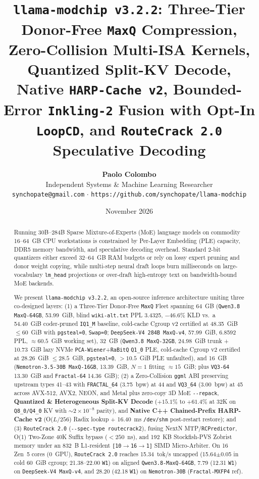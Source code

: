 \documentclass[10pt,twocolumn]{article}
\title{\textbf{\Large \texttt{llama-modchip v3.2.2}: Three-Tier Donor-Free \texttt{MaxQ} Compression, Zero-Collision Multi-ISA Kernels, Quantized Split-KV Decode, Native \texttt{HARP-Cache v2}, Bounded-Error \texttt{Inkling-2} Fusion with Opt-In \texttt{LoopCD}, and \texttt{RouteCrack 2.0} Speculative Decoding}}
\author{
  \textbf{Paolo Colombo} \\
  Independent Systems \& Machine Learning Researcher \\
  \texttt{synchopate@gmail.com} \quad $\cdot$ \quad \texttt{https://github.com/synchopate/llama-modchip}
}
\date{November 2026}
\begin{document}
\maketitle

\begin{abstract}
Running 30B--284B Sparse Mixture-of-Experts (MoE) language models on commodity 16--64~GB CPU workstations is constrained by Per-Layer Embedding (PLE) capacity, DDR5 memory bandwidth, and speculative decoding overhead. Standard 2-bit quantizers either exceed 32--64~GB RAM budgets or rely on lossy expert pruning and donor weight copying, while multi-step neural draft loops burn milliseconds on large-vocabulary \texttt{lm\_head} projections or over-draft high-entropy text on bandwidth-bound MoE backends.

We present \texttt{llama-modchip v3.2.2}, an open-source inference architecture uniting three co-designed layers: (1) a Three-Tier Donor-Free \texttt{MaxQ} Fleet spanning 64~GB (\texttt{Qwen3.8 MaxQ-64GB}, 53.99~GiB, blind \texttt{wiki-alt.txt} PPL 3.4325, $-46.6\%$ KLD vs.\ a 54.40~GiB coder-pruned \texttt{IQ1\_M} baseline, cold-cache Cgroup v2 certified at 48.35~GiB $\le 60$~GiB with \texttt{pgsteal=0}, \texttt{Swap=0}; \texttt{DeepSeek-V4 284B MaxQ-v4}, 57.99~GiB, 6.8592 PPL, $\approx 60.5$~GiB working set), 32~GB (\texttt{Qwen3.8 MaxQ-32GB}, 24.98~GiB trunk + 10.73~GiB lazy NVMe \texttt{PCA-Wiener}+\texttt{RaBitQ} \mbox{\texttt{Q1\_0}} PLE, cold-cache Cgroup v2 certified at 28.26~GiB $\le 28.5$~GiB, \texttt{pgsteal=0}, $>10.5$~GiB PLE unfaulted), and 16~GB (\texttt{Nemotron-3.5-30B MaxQ-16GB}, 13.39~GiB, $N=1$ fitting ${\approx}15$~GiB; plus \texttt{VQ3-64} 13.30~GiB and \texttt{Fractal-64} 14.36~GiB); (2) a Zero-Collision \texttt{ggml} ABI preserving upstream types 41--43 with \texttt{FRACTAL\_64} (3.75~bpw) at 44 and \texttt{VQ3\_64} (3.00~bpw) at 45 across AVX-512, AVX2, NEON, and Metal plus zero-copy 3D MoE \texttt{{-}{-}repack}, \textbf{Quantized \& Heterogeneous Split-KV Decode} ($+15.1\%$ to $+61.4\%$ at 32K on \texttt{Q8\_0/Q4\_0} KV with ${\sim}2\times 10^{-8}$ parity), and \textbf{Native C++ Chained-Prefix HARP-Cache v2} (O($L/256$) Radix lookup + 16.40~ms \texttt{/dev/shm} post-restart restore); and (3) \texttt{RouteCrack 2.0} (\texttt{{-}{-}spec-type routecrack2}), fusing NextN MTP/\texttt{RCPredictor}, O(1) Two-Zone 40K Suffix bypass ($<250$~ns), and 192~KB Stockfish-PVS Zobrist memory under an 832~B L1-resident \texttt{[10$\to$16$\to$1]} SIMD Micro-Arbiter. On 16 Zen~5 cores (0~GPU), \texttt{RouteCrack 2.0} reaches 15.34~tok/s uncapped (15.64$\pm$0.05 in cold 60~GiB cgroup; 21.38--22.00 \texttt{W1}) on aligned \texttt{Qwen3.8-MaxQ-64GB}, 7.79 (12.31 \texttt{W1}) on \texttt{DeepSeek-V4 MaxQ-v4}, and 28.20 (42.18 \texttt{W1}) on \texttt{Nemotron-30B} (\texttt{Fractal-MXFP4} ref).
\end{abstract}
\end{document}
